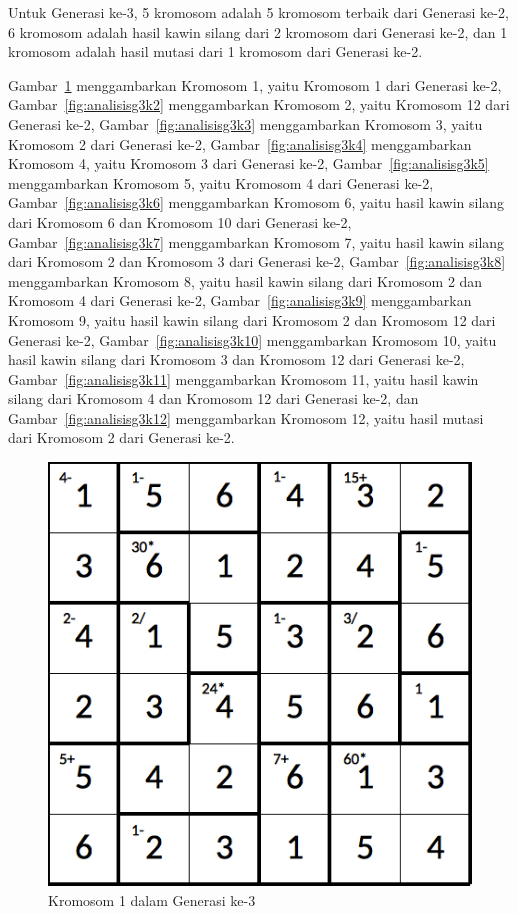 \documentclass[a4paper,twoside]{article}
\begin{document}
\begin{enumerate}
Untuk Generasi ke-3, 5 kromosom adalah 5 kromosom terbaik dari Generasi ke-2, 6 kromosom adalah hasil kawin silang dari 2 kromosom dari Generasi ke-2, dan 1 kromosom adalah hasil mutasi dari 1 kromosom dari Generasi ke-2.

Gambar~\ref{fig:analisisg3k1} menggambarkan Kromosom 1, yaitu Kromosom 1 dari Generasi ke-2, Gambar~\ref{fig:analisisg3k2} menggambarkan Kromosom 2, yaitu Kromosom 12 dari Generasi ke-2, Gambar~\ref{fig:analisisg3k3} menggambarkan Kromosom 3, yaitu Kromosom 2 dari Generasi ke-2, Gambar~\ref{fig:analisisg3k4} menggambarkan Kromosom 4, yaitu Kromosom 3 dari Generasi ke-2, Gambar~\ref{fig:analisisg3k5} menggambarkan Kromosom 5, yaitu Kromosom 4 dari Generasi ke-2, Gambar~\ref{fig:analisisg3k6} menggambarkan Kromosom 6, yaitu hasil kawin silang dari Kromosom 6 dan Kromosom 10 dari Generasi ke-2, Gambar~\ref{fig:analisisg3k7} menggambarkan Kromosom 7, yaitu hasil kawin silang dari Kromosom 2 dan Kromosom 3 dari Generasi ke-2, Gambar~\ref{fig:analisisg3k8} menggambarkan Kromosom 8, yaitu hasil kawin silang dari Kromosom 2 dan Kromosom 4 dari Generasi ke-2, Gambar~\ref{fig:analisisg3k9} menggambarkan Kromosom 9, yaitu hasil kawin silang dari Kromosom 2 dan Kromosom 12 dari Generasi ke-2, Gambar~\ref{fig:analisisg3k10} menggambarkan Kromosom 10, yaitu hasil kawin silang dari Kromosom 3 dan Kromosom 12 dari Generasi ke-2, Gambar~\ref{fig:analisisg3k11} menggambarkan Kromosom 11, yaitu hasil kawin silang dari Kromosom 4 dan Kromosom 12 dari Generasi ke-2, dan Gambar~\ref{fig:analisisg3k12} menggambarkan Kromosom 12, yaitu hasil mutasi dari Kromosom 2 dari Generasi ke-2.

\clearpage

\begin{figure}
\centering
\captionsetup{justification=centering}
\includegraphics[scale=0.333]{Gambar/hybridgenetic/Generation3Chromosome1}
\caption[Kromosom 1 dalam Generasi ke-3]{Kromosom 1 dalam Generasi ke-3}
\label{fig:analisisg3k1}
\end{figure}


\end{enumerate}
\end{document}
